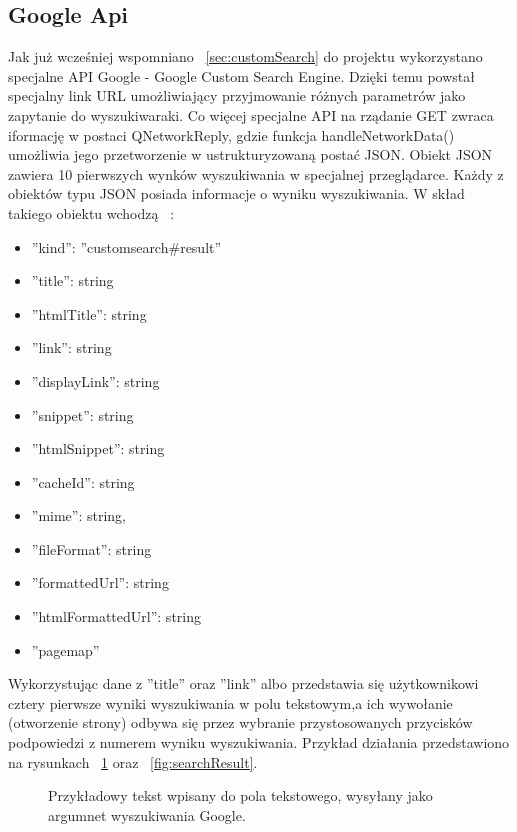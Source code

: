 \documentclass[twoside,a4paper]{book}
\begin{document}
\subsection{Google Api}
Jak już wcześniej wspomniano ~\ref{sec:customSearch} do projektu wykorzystano specjalne API Google - Google Custom Search Engine. Dzięki temu powstał specjalny link URL umożliwiający przyjmowanie różnych parametrów jako zapytanie do wyszukiwaraki. Co więcej specjalne API na rządanie GET zwraca iformację w postaci QNetworkReply, gdzie funkcja handleNetworkData() umożliwia jego przetworzenie w ustrukturyzowaną postać JSON. Obiekt JSON zawiera 10 pierwszych wynków wyszukiwania w specjalnej przeglądarce. Każdy z obiektów typu JSON posiada informacje o wyniku wyszukiwania. W skład takiego obiektu wchodzą ~\cite{googleJSON}:
\begin{itemize}
\item ''kind'': ''customsearch\#result''
\item ''title'': string
\item ''htmlTitle'': string
\item ''link'': string
\item ''displayLink'': string
\item ''snippet'': string
\item ''htmlSnippet'': string
\item  ''cacheId'': string
\item ''mime'': string,
\item ''fileFormat'': string
\item ''formattedUrl'': string
\item ''htmlFormattedUrl'': string
\item ''pagemap''
\end{itemize} 
Wykorzystując dane z ''title'' oraz ''link'' albo przedstawia się użytkownikowi cztery pierwsze wyniki wyszukiwania w polu tekstowym,a ich wywołanie (otworzenie strony) odbywa się przez wybranie przystosowanych przycisków podpowiedzi z numerem wyniku wyszukiwania. Przykład działania przedstawiono na rysunkach ~\ref{fig:googleSearch} oraz ~\ref{fig:searchResult}. 

			\begin{figure}[!h]
		\centering
		\caption{Przykładowy tekst wpisany do pola tekstowego, wysyłany jako argumnet wyszukiwania Google.}
		\label{fig:googleSearch}
		\end{figure}
\end{document}
